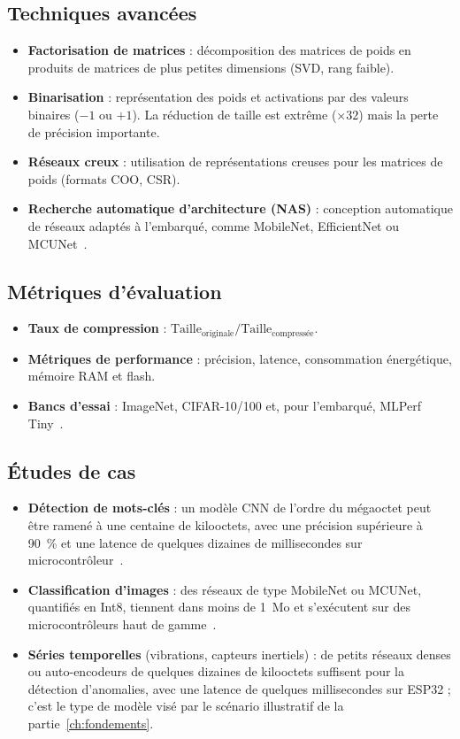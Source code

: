 \subsection{Techniques avancées}
\begin{itemize}
  \item \textbf{Factorisation de matrices} : décomposition des matrices de poids
        en produits de matrices de plus petites dimensions (SVD, rang faible).
  \item \textbf{Binarisation} : représentation des poids et activations par des
        valeurs binaires ($-1$ ou $+1$). La réduction de taille est extrême
        ($\times 32$) mais la perte de précision importante.
  \item \textbf{Réseaux creux} : utilisation de représentations creuses pour les
        matrices de poids (formats COO, CSR).
  \item \textbf{Recherche automatique d'architecture (NAS)} : conception
        automatique de réseaux adaptés à l'embarqué, comme MobileNet,
        EfficientNet ou MCUNet~\cite{lin2020mcunet}.
\end{itemize}

\subsection{Métriques d'évaluation}
\begin{itemize}
  \item \textbf{Taux de compression} : $\text{Taille}_{\text{originale}} / \text{Taille}_{\text{compressée}}$.
  \item \textbf{Métriques de performance} : précision, latence, consommation énergétique, mémoire RAM et flash.
  \item \textbf{Bancs d'essai} : ImageNet, CIFAR-10/100 et, pour l'embarqué, MLPerf Tiny~\cite{banbury2021mlperftiny}.
\end{itemize}

\subsection{Études de cas}
\begin{itemize}
  \item \textbf{Détection de mots-clés} : un modèle CNN de l'ordre du mégaoctet
        peut être ramené à une centaine de kilooctets, avec une précision
        supérieure à 90~\% et une latence de quelques dizaines de millisecondes
        sur microcontrôleur~\cite{banbury2021mlperftiny}.
  \item \textbf{Classification d'images} : des réseaux de type MobileNet ou
        MCUNet, quantifiés en Int8, tiennent dans moins de 1~Mo et s'exécutent
        sur des microcontrôleurs haut de gamme~\cite{lin2020mcunet}.
  \item \textbf{Séries temporelles} (vibrations, capteurs inertiels) : de petits
        réseaux denses ou auto-encodeurs de quelques dizaines de kilooctets
        suffisent pour la détection d'anomalies, avec une latence de quelques
        millisecondes sur ESP32 ; c'est le type de modèle visé par le scénario illustratif de la partie~\ref{ch:fondements}.
\end{itemize}
